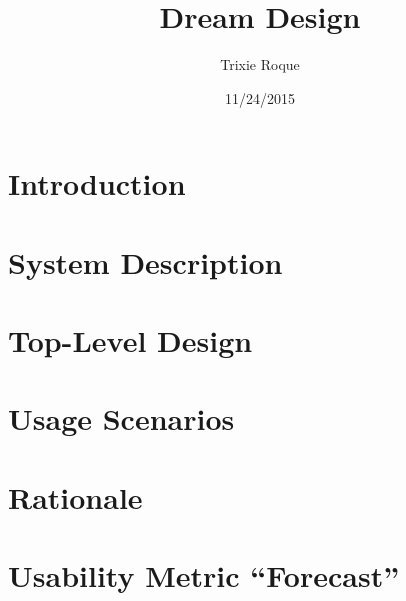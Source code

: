 \documentclass[11pt]{article}
\title{Dream Design}
\author{Trixie Roque}
\date{11/24/2015}
\begin{document}
\maketitle

\begin{abstract}

\end{abstract}

\pagebreak
\tableofcontents

\pagebreak

\section{Introduction}
\label{Introduction}



\section{System Description}
\label{System Description}




\section{Top-Level Design}


\begin{figure}[ht]
\centering
\label{buttons}
\end{figure}



\section{Usage Scenarios}

\section{Rationale}

\section{Usability Metric ``Forecast''}

\clearpage


\end{document}
